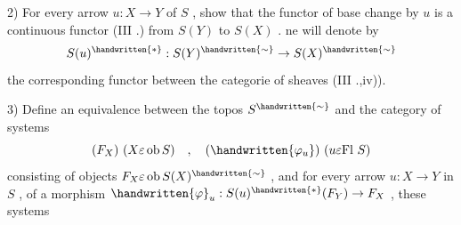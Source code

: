 2) For every arrow \(u:X\to Y\) of \(S\) , show that the functor of base change by \(u\) is a continuous functor (III .) from \(S(Y)\) to \(S(X)\) . ne will denote by
\[
S(u)^{\handwritten{*}}:S(Y)^{\handwritten{\sim}}\to S(X)^{\handwritten{\sim}}
\]
the corresponding functor between the categorie of sheaves (III .,iv)).

3) Define an equivalence between the topos \(S^{\handwritten{\sim}}\) and the category of systems
\[
(F_X)\ (X\varepsilon\operatorname{ob}S)\quad,\quad(\handwritten{\varphi_u})\ (u\varepsilon\mathrm{Fl}\ S)
\]
consisting of objects \(F_X\varepsilon\operatorname{ob}S(X)^{\handwritten{\sim}}\) , and for every arrow \(u:X\to Y\) in \(S\) , of a morphism \(\handwritten{\varphi}_u:S(u)^{\handwritten{*}}(F_Y)\to F_X\) , these systems

